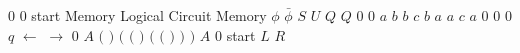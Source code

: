 \documentclass{article}
\begin{document}
$0$%
\stopmpxshipout
\mpxshipout%
$0$%
\stopmpxshipout
\mpxshipout%
start%
\stopmpxshipout
\mpxshipout%
Memory%
\stopmpxshipout
\mpxshipout%
Logical Circuit%
\stopmpxshipout
\mpxshipout%
Memory%
\stopmpxshipout
\mpxshipout%
$\phi$%
\stopmpxshipout
\mpxshipout%
$\bar \phi$%
\stopmpxshipout
\mpxshipout%
$S$%
\stopmpxshipout
\mpxshipout%
$U$%
\stopmpxshipout
\mpxshipout%
$Q$%
\stopmpxshipout
\mpxshipout%
$Q$%
\stopmpxshipout
\mpxshipout%
$0$%
\stopmpxshipout
\mpxshipout%
$0$%
\stopmpxshipout
\mpxshipout%
$a$%
\stopmpxshipout
\mpxshipout%
$b$%
\stopmpxshipout
\mpxshipout%
$b$%
\stopmpxshipout
\mpxshipout%
$c$%
\stopmpxshipout
\mpxshipout%
$b$%
\stopmpxshipout
\mpxshipout%
$a$%
\stopmpxshipout
\mpxshipout%
$a$%
\stopmpxshipout
\mpxshipout%
$c$%
\stopmpxshipout
\mpxshipout%
$a$%
\stopmpxshipout
\mpxshipout%
$0$%
\stopmpxshipout
\mpxshipout%
$0$%
\stopmpxshipout
\mpxshipout%
$0$%
\stopmpxshipout
\mpxshipout%
$q$%
\stopmpxshipout
\mpxshipout%
$\leftarrow $%
\stopmpxshipout
\mpxshipout%
$\rightarrow $%
\stopmpxshipout
\mpxshipout%
$0$%
\stopmpxshipout
\mpxshipout%
$A$%
\stopmpxshipout
\mpxshipout%
$($%
\stopmpxshipout
\mpxshipout%
$)$%
\stopmpxshipout
\mpxshipout%
$($%
\stopmpxshipout
\mpxshipout%
$($%
\stopmpxshipout
\mpxshipout%
$)$%
\stopmpxshipout
\mpxshipout%
$($%
\stopmpxshipout
\mpxshipout%
$($%
\stopmpxshipout
\mpxshipout%
$)$%
\stopmpxshipout
\mpxshipout%
$)$%
\stopmpxshipout
\mpxshipout%
$)$%
\stopmpxshipout
\mpxshipout%
$A$%
\stopmpxshipout
\mpxshipout%
$0$%
\stopmpxshipout
\mpxshipout%
start%
\stopmpxshipout
\mpxshipout%
$L$%
\stopmpxshipout
\mpxshipout%
$R$%
\stopmpxshipout
\mpxshipout%
\end{document}
